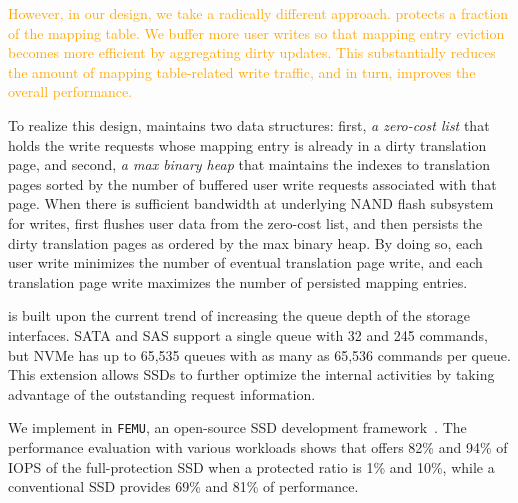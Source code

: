 
\textcolor{orange}{However, in our design,
we take a radically different approach. \ours{} protects a fraction of the mapping table. 
We buffer more user writes so that mapping entry eviction becomes more efficient
by aggregating dirty updates. This substantially reduces the
amount of mapping table-related write traffic, and in turn,
improves the overall performance.}

To realize this design, 
\ours{} maintains two data structures: first, \textit{a zero-cost list} 
that holds the write requests whose mapping entry is already in a dirty translation page, 
and second, \textit{a max binary heap} that maintains the indexes to translation pages
sorted by the number of buffered user write requests associated with that page. 
When there is sufficient bandwidth at underlying NAND flash subsystem for writes, 
\ours{} first flushes user data from the  zero-cost list,
and then persists the dirty translation pages as ordered by the max binary heap. 
By doing so, each user write minimizes the number of eventual translation page write, 
and each translation page write maximizes the number of persisted mapping entries. 


\ours{} is built upon the current trend of increasing the queue depth of the storage interfaces. SATA and SAS support a single queue with 32 and 245 commands, but NVMe has 
up to 65,535 queues with as many as 65,536 commands per queue. 
This extension allows SSDs to further optimize the internal activities by taking advantage of the outstanding request information.

We implement \ours{} in \texttt{FEMU}, an open-source SSD development framework~\cite{li2018case}.
The performance evaluation with various workloads shows that \ours{} offers 82\% and 94\% of IOPS of the full-protection SSD when a protected ratio is 1\% and 10\%, while a conventional SSD provides 69\% and 81\% of performance.  


